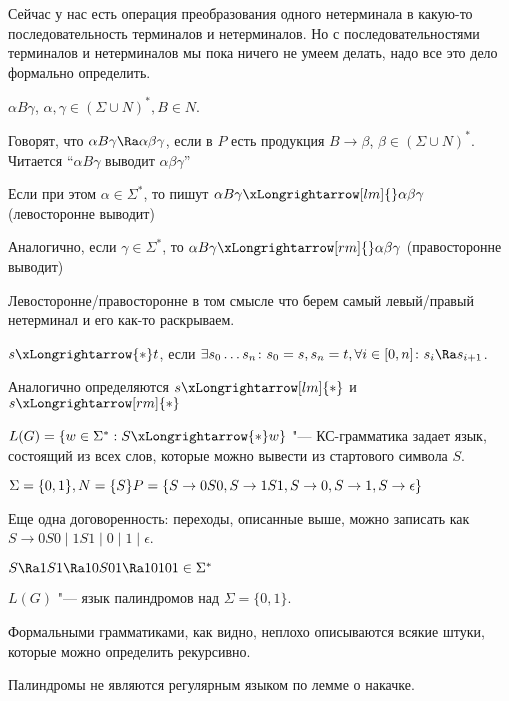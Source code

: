Сейчас у нас есть операция преобразования одного нетерминала в какую-то последовательность терминалов и нетерминалов. 
Но с последовательностями терминалов и нетерминалов мы пока ничего не умеем делать, надо все это дело формально определить.

\begin{Def}        
    $\alpha B \gamma$, $\alpha, \gamma \in (\Sigma \cup N)^*, B \in N$.

    Говорят, что $\alpha B \gamma \Ra \alpha \beta \gamma$, если в $P$ есть продукция $B \to \beta$, $\beta \in (\Sigma \cup N)^*$. 
    Читается ``$\alpha B \gamma$ выводит $\alpha \beta \gamma$''
\end{Def}

\begin{Def}
    Если при этом $\alpha \in \Sigma^*$, то пишут
    $\alpha B \gamma \xLongrightarrow[lm]{} \alpha \beta \gamma$ (левосторонне выводит)

    Аналогично, если $\gamma \in \Sigma^*$, то
    $\alpha B \gamma \xLongrightarrow[rm]{} \alpha \beta \gamma$ (правосторонне выводит)
\end{Def}
\begin{Rem}
    Левосторонне/правосторонне в том смысле что берем самый левый/правый нетерминал и его как-то раскрываем.
\end{Rem}

\begin{Def}
$s \xLongrightarrow{*} t$, если $\exists s_0\dots s_n \colon s_0 = s, s_n = t, \forall i \in [0, n] \colon s_i \Ra s_{i+1}$.

Аналогично определяются $s \xLongrightarrow[lm]{*}$ и $s \xLongrightarrow[rm]{*}$
\end{Def}

\begin{Def}
$L(G) = \{w \in \Sigma^*: S \xLongrightarrow{*} w\}$ "--- КС-грамматика задает язык, состоящий из всех слов, которые можно вывести из стартового символа $S$.
\end{Def}

\begin{exmp}
$\Sigma = \{0, 1\}, N = \{S\} \\
P = \{S \to 0S0, S \to 1S1, S \to 0, S \to 1, S \to \epsilon\}$

Еще одна договоренность: переходы, описанные выше, можно записать как $S \to 0S0 \mid 1S1 \mid 0 \mid 1 \mid \epsilon$.

$S \Ra 1S1 \Ra 10S01 \Ra 10101 \in \Sigma^*$

$L(G)$ "--- язык палиндромов над $\Sigma = \{0, 1\}$.

Формальными грамматиками, как видно, неплохо описываются всякие штуки, которые можно определить рекурсивно.
\end{exmp}
\begin{Rem}
Палиндромы не являются регулярным языком по лемме о накачке.
\end{Rem}

